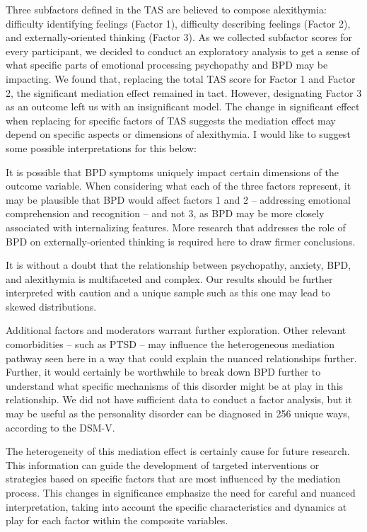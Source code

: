 \documentclass[
  man,floatsintext]{apa6}
\begin{document}
Three subfactors defined in the TAS are believed to compose alexithymia: difficulty identifying feelings (Factor 1), difficulty describing feelings (Factor 2), and externally-oriented thinking (Factor 3). As we collected subfactor scores for every participant, we decided to conduct an exploratory analysis to get a sense of what specific parts of emotional processing psychopathy and BPD may be impacting. We found that, replacing the total TAS score for Factor 1 and Factor 2, the significant mediation effect remained in tact. However, designating Factor 3 as an outcome left us with an insignificant model. The change in significant effect when replacing for specific factors of TAS suggests the mediation effect may depend on specific aspects or dimensions of alexithymia. I would like to suggest some possible interpretations for this below:

It is possible that BPD symptoms uniquely impact certain dimensions of the outcome variable. When considering what each of the three factors represent, it may be plausible that BPD would affect factors 1 and 2 -- addressing emotional comprehension and recognition -- and not 3, as BPD may be more closely associated with internalizing features. More research that addresses the role of BPD on externally-oriented thinking is required here to draw firmer conclusions.

It is without a doubt that the relationship between psychopathy, anxiety, BPD, and alexithymia is multifaceted and complex. Our results should be further interpreted with caution and a unique sample such as this one may lead to skewed distributions.

Additional factors and moderators warrant further exploration. Other relevant comorbidities -- such as PTSD -- may influence the heterogeneous mediation pathway seen here in a way that could explain the nuanced relationships further. Further, it would certainly be worthwhile to break down BPD further to understand what specific mechanisms of this disorder might be at play in this relationship. We did not have sufficient data to conduct a factor analysis, but it may be useful as the personality disorder can be diagnosed in 256 unique ways, according to the DSM-V.

The heterogeneity of this mediation effect is certainly cause for future research. This information can guide the development of targeted interventions or strategies based on specific factors that are most influenced by the mediation process. This changes in significance emphasize the need for careful and nuanced interpretation, taking into account the specific characteristics and dynamics at play for each factor within the composite variables.
\end{document}
